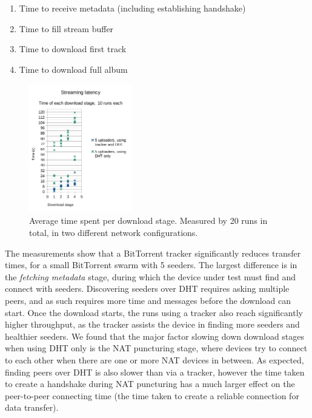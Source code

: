 \begin{enumerate}
    \item Time to receive metadata (including establishing handshake)
    \item Time to fill stream buffer
    \item Time to download first track
    \item Time to download full album
\end{enumerate}

\begin{figure}
    \centering
    \includegraphics[width=0.4\textwidth]{evaluation/download-times.png}
    \caption{Average time spent per download stage. Measured by 20 runs in total, in two different network configurations.}
    \label{fig:download-times}
\end{figure}

The measurements show that a BitTorrent tracker significantly reduces transfer times, for a small BitTorrent swarm with 5 seeders. The largest difference is in the \textit{fetching metadata} stage, during which the device under test must find and connect with seeders. Discovering seeders over DHT requires asking multiple peers, and as such requires more time and messages before the download can start. Once the download starts, the runs using a tracker also reach significantly higher throughput, as the tracker assists the device in finding more seeders and healthier seeders. We found that the major factor slowing down download stages when using DHT only is the NAT puncturing stage, where devices try to connect to each other when there are one or more NAT devices in between. As expected, finding peers over DHT is also slower than via a tracker, however the time taken to create a handshake during NAT puncturing has a much larger effect on the peer-to-peer connecting time (the time taken to create a reliable connection for data transfer). 

